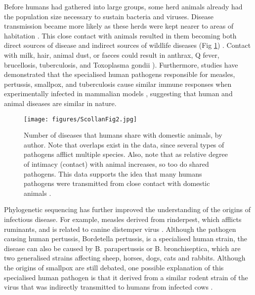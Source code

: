 Before humans had gathered into large groups, some herd animals already had the population size necessary to sustain bacteria and viruses. Disease transmission became more likely as these herds were kept nearer to areas of habitation \parencite[273]{Armelagos_1970}. 
This close contact with animals resulted in them becoming both direct sources of disease and indirect sources of wildlife diseases (Fig \ref{fig:ScollanFig2}) \parencites[370]{Pearce-Duvet_2006}[446]{Daszak_2000}. 
Contact with milk, hair, animal dust, or faeces could result in anthrax, Q fever, 
brucellosis, tuberculosis, and Toxoplasma gondii \parencites[273]{Armelagos_1970}[2750]{Sibley_2009}). 
Furthermore, studies have demonstrated that the specialised human pathogens responsible for measles, 
pertussis, smallpox, and tuberculosis cause similar immune responses when experimentally 
infected in mammalian models \parencites{Norrby_1985}{Arico_1987}, 
suggesting that human and animal diseases are similar in nature.

	\begin{figure}[!htb]
		\texttt{[image: figures/ScollanFig2.jpg]}
		\caption{Number of diseases that humans share with domestic animals, by author. Note that overlaps exist in the data, since several types of pathogens afflict multiple species. 
Also, note that as relative degree of intimacy (contact) with animal increases, so too do shared pathogens. This data supports the idea that many humans pathogens were transmitted from close contact with domestic animals \parencites{McNeill_1984}{Hull_1963}.}
		\label{fig:ScollanFig2} %
	\end{figure}
Phylogenetic sequencing has further improved the understanding of the origins of infectious disease. For example, measles derived from rinderpest, which afflicts ruminants, and is related to canine distemper virus 
\parencite{Westover_2001}. Although the pathogen causing human pertussis, Bordetella pertussis, is a specialised human strain, the disease can also be caused by B. parapertussis or B. bronchiseptica, 
which are two generalised strains affecting sheep, horses, dogs, cats and rabbits\parencite[259]{Porter_1994}. 
Although the origins of smallpox are still debated, 
one possible explanation of this specialised human pathogen 
is that it derived from a similar rodent strain of the virus that was 
indirectly transmitted to humans from infected cows \parencites{Pulford_2002}[115--116]{Gubser_2002}. 

